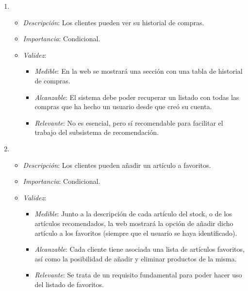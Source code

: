 \begin{enumerate}[{\bf RF-1}]
\item 
  \begin{itemize}
  \item \textit{Descripción}: Los clientes pueden ver su historial de compras.
  \item \textit{Importancia}: Condicional.
  \item \textit{Validez}:
    \begin{itemize}
    \item \textit{Medible}: En la web se mostrará una sección con una tabla de historial de compras.
    \item \textit{Alcanzable}: El sistema debe poder recuperar un listado con todas las compras que ha hecho un usuario desde que creó su cuenta.
    \item \textit{Relevante}: No es esencial, pero sí recomendable para facilitar el trabajo del subsistema de recomendación.
    \end{itemize}
  \end{itemize}

\item 
  \begin{itemize}
  \item \textit{Descripción}: Los clientes pueden añadir un artículo a favoritos.
  \item \textit{Importancia}: Condicional.
  \item \textit{Validez}:
    \begin{itemize}
    \item \textit{Medible}: Junto a la descripción de cada artículo del stock, o de los artículos recomendados, la web mostrará la opción de añadir dicho artículo a los favoritos (siempre que el usuario se haya identificado).
    \item \textit{Alcanzable}: Cada cliente tiene asociada una lista de artículos favoritos, así como la posibilidad de añadir y eliminar productos de la misma.
    \item \textit{Relevante}: Se trata de un requisito fundamental para poder hacer uso del listado de favoritos.
    \end{itemize}
  \end{itemize}


\end{enumerate}
